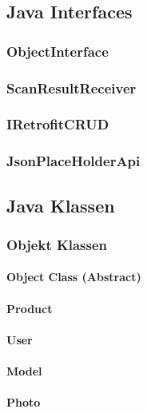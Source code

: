 \documentclass{scrartcl}
\begin{document}
\subsection{Java Interfaces}

\subsubsection{ObjectInterface}

\subsubsection{ScanResultReceiver}

\subsubsection{IRetrofitCRUD}

\subsubsection{JsonPlaceHolderApi}

\subsection{Java Klassen}

\subsubsection{Objekt Klassen}

\paragraph{Object Class (Abstract)}

\paragraph{Product}

\paragraph{User}

\paragraph{Model}

\paragraph{Photo}
\end{document}
